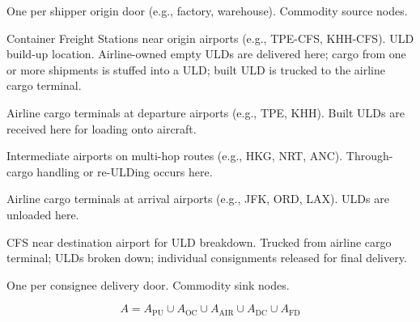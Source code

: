 \documentclass[11pt,a4paper]{article}
\theoremstyle{definition}
\begin{document}
\begin{description}[leftmargin=3.4cm, labelwidth=3.2cm, style=nextline]
  \item[$N_O$ — Origins] One per shipper origin door (e.g., factory, warehouse). Commodity source nodes.
  \item[$N_{\text{CFS,O}}$ — Origin CFS] Container Freight Stations near origin airports
        (e.g., TPE-CFS, KHH-CFS). ULD build-up location. Airline-owned empty ULDs are
        delivered here; cargo from one or more shipments is stuffed into a ULD; built ULD
        is trucked to the airline cargo terminal.
  \item[$N_{\text{AP,O}}$ — Origin airports] Airline cargo terminals at departure airports
        (e.g., TPE, KHH). Built ULDs are received here for loading onto aircraft.
  \item[$N_{\text{AP,H}}$ — Hub airports] Intermediate airports on multi-hop routes
        (e.g., HKG, NRT, ANC). Through-cargo handling or re-ULDing occurs here.
  \item[$N_{\text{AP,D}}$ — Destination airports] Airline cargo terminals at arrival airports
        (e.g., JFK, ORD, LAX). ULDs are unloaded here.
  \item[$N_{\text{CFS,D}}$ — Destination CFS] CFS near destination airport for ULD breakdown.
        Trucked from airline cargo terminal; ULDs broken down; individual consignments
        released for final delivery.
  \item[$N_D$ — Destinations] One per consignee delivery door. Commodity sink nodes.
\end{description}

\[
  A = A_{\text{PU}} \cup A_{\text{OC}} \cup A_{\text{AIR}} \cup A_{\text{DC}} \cup A_{\text{FD}}
\]
\end{document}
